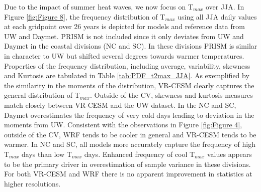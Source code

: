 Due to the impact of summer heat waves, we now focus on T$_{max}$ over JJA. In Figure \ref{fig:Figure 8}, the frequency distribution of T$_{max}$ using all JJA daily values at each gridpoint over 26 years is depicted for models and reference data from UW and Daymet. PRISM is not included since it only deviates from UW and Daymet in the coastal divisions (NC and SC).  In these divisions PRISM is similar in character to UW but shifted several degrees towards warmer temperatures. Properties of the frequency distribution, including average, variability, skewness and Kurtosis are tabulated in Table \ref{tab:PDF_t2max_JJA}.  As exemplified by the similarity in the moments of the distribution, VR-CESM clearly captures the general distribution of T$_{max}$. Outside of the CV, skewness and kurtosis measures match closely between VR-CESM and the UW dataset. In the NC and SC, Daymet overestimates the frequency of very cold days leading to deviation in the moments from UW.  Consistent with the observations in Figure \ref{fig:Figure 4}, outside of the CV, WRF tends to be cooler in general and VR-CESM tends to be warmer.  In NC and SC, all models more accurately capture the frequency of high T$_{max}$ days than low T$_{max}$ days. Enhanced frequency of cool T$_{max}$ values appears to be the primary driver in overestimation of sample variance in these divisions. For both VR-CESM and WRF there is no apparent improvement in statistics at higher resolutions.

